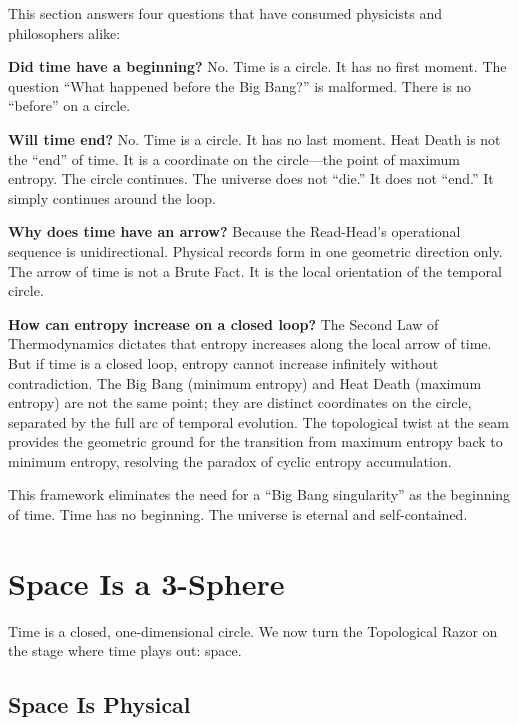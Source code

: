 \documentclass[11pt]{article}
\theoremstyle{canonstyle}
\begin{document}
\begin{realization}
This section answers four questions that have consumed physicists and philosophers alike:

\medskip

\textbf{Did time have a beginning?}
No. Time is a circle. It has no first moment. The question ``What happened before the Big Bang?'' is malformed. There is no ``before'' on a circle.

\textbf{Will time end?}
No. Time is a circle. It has no last moment. Heat Death is not the ``end'' of time. It is a coordinate on the circle---the point of maximum entropy. The circle continues. The universe does not ``die.'' It does not ``end.'' It simply continues around the loop.

\textbf{Why does time have an arrow?}
Because the Read-Head's operational sequence is unidirectional. Physical records form in one geometric direction only. The arrow of time is not a Brute Fact. It is the local orientation of the temporal circle.

\textbf{How can entropy increase on a closed loop?}
The Second Law of Thermodynamics dictates that entropy increases along the local arrow of time. But if time is a closed loop, entropy cannot increase infinitely without contradiction. The Big Bang (minimum entropy) and Heat Death (maximum entropy) are not the same point; they are distinct coordinates on the circle, separated by the full arc of temporal evolution. The topological twist at the seam provides the geometric ground for the transition from maximum entropy back to minimum entropy, resolving the paradox of cyclic entropy accumulation.

\medskip

This framework eliminates the need for a ``Big Bang singularity'' as the beginning of time. Time has no beginning. The universe is eternal and self-contained.
\end{realization}

\newpage

\section{Space Is a 3-Sphere}

Time is a closed, one-dimensional circle. We now turn the Topological Razor on the stage where time plays out: space. 

\subsection{Space Is Physical}
\end{document}
